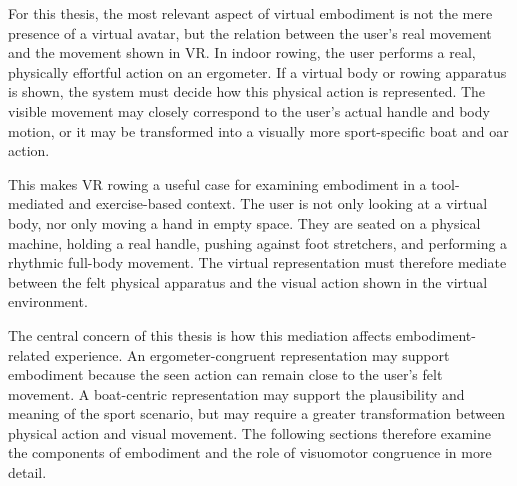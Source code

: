 For this thesis, the most relevant aspect of virtual embodiment is not the mere presence of a virtual avatar, but the relation between the user's real movement and the movement shown in VR. In indoor rowing, the user performs a real, physically effortful action on an ergometer. If a virtual body or rowing apparatus is shown, the system must decide how this physical action is represented. The visible movement may closely correspond to the user's actual handle and body motion, or it may be transformed into a visually more sport-specific boat and oar action.

This makes VR rowing a useful case for examining embodiment in a tool-mediated and exercise-based context. The user is not only looking at a virtual body, nor only moving a hand in empty space. They are seated on a physical machine, holding a real handle, pushing against foot stretchers, and performing a rhythmic full-body movement. The virtual representation must therefore mediate between the felt physical apparatus and the visual action shown in the virtual environment.

The central concern of this thesis is how this mediation affects embodiment-related experience. An ergometer-congruent representation may support embodiment because the seen action can remain close to the user's felt movement. A boat-centric representation may support the plausibility and meaning of the sport scenario, but may require a greater transformation between physical action and visual movement. The following sections therefore examine the components of embodiment and the role of visuomotor congruence in more detail.
